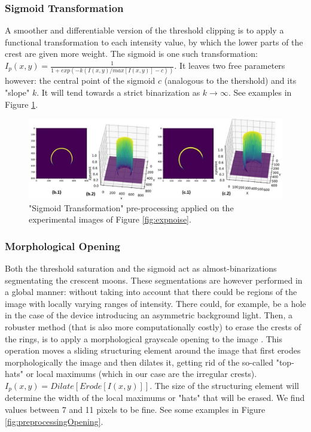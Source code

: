 \documentclass[11pt, a4paper, twoside]{article} %
\begin{document}
\subsubsection*{Sigmoid Transformation}
\vspace{-0.3cm}
A smoother and differentiable version of the threshold clipping is to apply a functional transformation to each intensity value, by which the lower parts of the crest are given more weight. The sigmoid is one such transformation: $I_p(x,y)=\frac{1}{1+exp(-k(I(x,y)/max[I(x,y)]-c))}$. It leaves two free parameters however: the central point of the sigmoid $c$ (analogous to the thershold) and its "slope" $k$. It will tend towards a strict binarization as $k\rightarrow \infty$. See examples in Figure \ref{fig:preprocessingSigmoid}.\vspace{-0.2cm}
\begin{figure}[h!] 
     \centering 
    \includegraphics[width=0.9\linewidth]{sigmoid.jpg}
    \caption{"Sigmoid Transformation" pre-processing applied on the experimental images of Figure \ref{fig:expnoise}.}
    \label{fig:preprocessingSigmoid}
\end{figure}

\subsubsection*{Morphological Opening}\vspace{-0.25cm}
Both the threshold saturation and the sigmoid act as almost-binarizations segmentating the crescent moons. These segmentations are however performed in a global manner: without taking into account that there could be regions of the image with locally varying ranges of intensity. There could, for example, be a hole in the case of the device introducing an asymmetric background light. Then, a robuster method (that is also more computationally costly) to erase the crests of the rings, is to apply a morphological grayscale opening to the image \cite{opening}. This operation moves a sliding structuring element around the image that first erodes morphologically the image and then dilates it, getting rid of the so-called "top-hats" or local maximums (which in our case are the irregular crests). $I_p(x,y)=Dilate[Erode[I(x,y)]]$. The size of the structuring element will determine the width of the local maximums or "hats" that will be erased. We find values between 7 and 11 pixels to be fine. See some examples in Figure \ref{fig:preprocessingOpening}.
\end{document}
